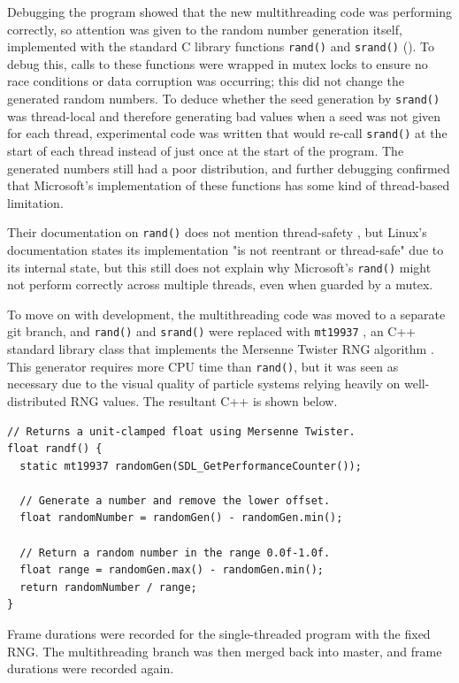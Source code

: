 \documentclass[11pt, a4paper, twocolumn]{article}
\begin{document}
Debugging the program showed that the new multithreading code was performing correctly, so attention was given to the random number generation itself, implemented with the standard C library functions \verb|rand()| and \verb|srand()| (\citeyear{CLibRand}). To debug this, calls to these functions were wrapped in mutex locks to ensure no race conditions or data corruption was occurring; this did not change the generated random numbers. To deduce whether the seed generation by \verb|srand()| was thread-local and therefore generating bad values when a seed was not given for each thread, experimental code was written that would re-call \verb|srand()| at the start of each thread instead of just once at the start of the program. The generated numbers still had a poor distribution, and further debugging confirmed that Microsoft's implementation of these functions has some kind of thread-based limitation.

Their documentation on \verb|rand()| does not mention thread-safety \citep{CLibRandMicrosoft}, but Linux's documentation states its implementation "is not reentrant or thread-safe" \citep{CLibRandLinux} due to its internal state, but this still does not explain why Microsoft's \verb|rand()| might not perform correctly across multiple threads, even when guarded by a mutex.

To move on with development, the multithreading code was moved to a separate git branch, and \verb|rand()| and \verb|srand()| were replaced with \verb|mt19937| \citep{mt19937Docs}, an C++ standard library class that implements the Mersenne Twister RNG algorithm \citep{Matsumoto1998}. This generator requires more CPU time than \verb|rand()|, but it was seen as necessary due to the visual quality of particle systems relying heavily on well-distributed RNG values. The resultant C++ is shown below.

\begin{verbatim}
// Returns a unit-clamped float using Mersenne Twister.
float randf() {
  static mt19937 randomGen(SDL_GetPerformanceCounter());
  
  // Generate a number and remove the lower offset.
  float randomNumber = randomGen() - randomGen.min();
  
  // Return a random number in the range 0.0f-1.0f.
  float range = randomGen.max() - randomGen.min();
  return randomNumber / range;
}
\end{verbatim}

Frame durations were recorded for the single-threaded program with the fixed RNG. The multithreading branch was then merged back into master, and frame durations were recorded again.
\end{document}
